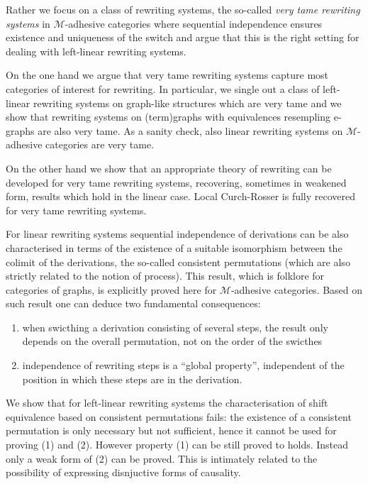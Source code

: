\documentclass[a4paper,UKenglish,cleveref,pdftex, thm-restate,numberwithinsect]{lipics}
\begin{document}
Rather we focus on a class of rewriting systems, the so-called
\emph{very tame rewriting systems} in $\mathcal{M}$-adhesive
categories where sequential independence ensures existence and
uniqueness of the switch and argue that this is the right setting for
dealing with left-linear rewriting systems.

On the one hand we argue that very tame rewriting systems capture most
categories of interest for rewriting. In particular, we single out a
class of left-linear rewriting systems on graph-like structures which
are very tame and we show that rewriting systems on (term)graphs with
equivalences resempling e-graphs are also very tame. As a sanity
check, also linear rewriting systems on $\mathcal{M}$-adhesive
categories are very tame.

On the other hand we show that an appropriate theory of rewriting can
be developed for very tame rewriting systems, recovering, sometimes in
weakened form, results which hold in the linear case.  Local
Curch-Rosser is fully recovered for very tame rewriting systems.

For linear rewriting systems sequential independence of derivations
can be also characterised in terms of the existence of a suitable
isomorphism between the colimit of the derivations, the so-called
consistent permutations (which are also strictly related to the notion
of process). This result, which is folklore for categories of graphs,
is explicitly proved here for $\mathcal{M}$-adhesive categories. Based on such result one can deduce two fundamental consequences:
\begin{enumerate}
\item when swicthing a derivation consisting of several steps, the result only depends on the overall permutation, not on the order of the swicthes
\item independence of rewriting steps is a ``global property'', independent of the position in which these steps are in the derivation.
\end{enumerate}

We show that for left-linear rewriting systems the characterisation of
shift equivalence based on consistent permutations fails: the
existence of a consistent permutation is only necessary but not
sufficient, hence it cannot be used for proving (1) and (2). However property (1) can be still proved to holds. Instead only a weak form of (2) can be proved. This is intimately related to the possibility of expressing disnjuctive forms of causality.
\end{document}
